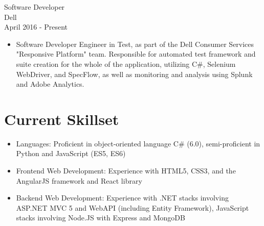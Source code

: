 \documentclass[11pt]{res} %
\begin{document}
\begin{resume}
 Software Developer \\
Dell \\
April 2016 - Present
\vspace{0.2in}
   \begin{itemize} \itemsep -2pt  %
   \item Software Developer Engineer in Test, as part of the Dell Consumer Services "Responsive Platform" team. Responsible for automated test framework and suite creation for the whole of the application, utilizing C\#, Selenium WebDriver, and SpecFlow, as well as monitoring and analysis using Splunk and Adobe Analytics.
 \end{itemize}

\section{Current Skillset} 
 
   \begin{itemize} \itemsep -2pt  %
   \item Languages: Proficient in object-oriented language C\# (6.0), 
semi-proficient in Python and JavaScript (ES5, ES6)
\\
   \item Frontend Web Development: Experience with HTML5, CSS3, and the AngularJS framework and React library
\\
    \item Backend Web Development: Experience with .NET stacks involving ASP.NET MVC 5 and WebAPI (including Entity Framework), JavaScript stacks involving Node.JS with Express and MongoDB
 \end{itemize}
 

\end{resume}
\end{document}

